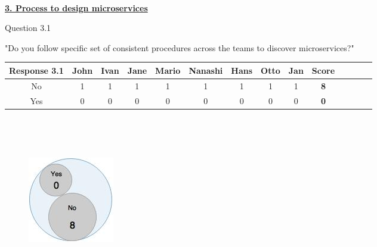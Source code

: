 \\
\textbf{\underline{3. Process to design microservices}}\\
\begin{shaded} Question 3.1 \end{shaded} \label{question:hybris_architecture/interview/question_3.1}
"Do you follow specific set of consistent procedures across the teams to discover microservices?"\\
\begin{table}[H]
\centering
\begin{adjustbox}{max width=\textwidth}
\begin{tabular}{*{14}{|c}|}%
\hline
\textbf{Response 3.1}   & John & Ivan & Jane & Mario & Nanashi & Hans & Otto & Jan & \textbf{Score}\\
 \hline
No          & 1 & 1 & 1 & 1 & 1 & 1 & 1 & 1 & \textbf{8}    \\ 
 \hline
Yes                & 0 & 0 & 0 & 0 & 0 & 0 & 0 & 0 & \textbf{0}    \\ 
 \hline
\end{tabular}
\end{adjustbox}
\label{tab:hybris_architecture/interview/question_2.3}
\end{table}
\\

\\
\begin{figure}[H]
\begin{center}
\includegraphics[scale=0.5]{figures/question3_1}
\label{fig:hybris_architecture/interview/question3-1}
\end{center}
\end{figure}
